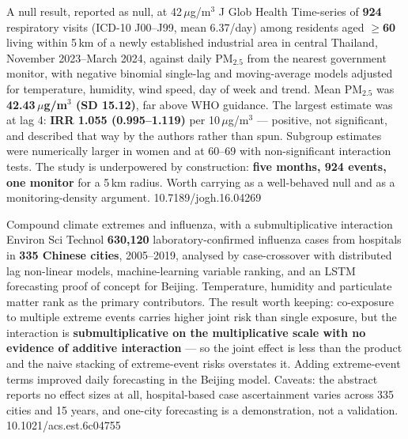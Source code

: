 \documentclass[10pt]{article}
\begin{document}
{A null result, reported as null, at 42\,$\mu$g/m$^3$}
{J Glob Health}
{Time-series of \textbf{924} respiratory visits (ICD-10 J00--J99, mean 6.37/day) among
residents aged \textbf{$\geq$60} living within 5\,km of a newly established industrial area
in central Thailand, November 2023--March 2024, against daily PM$_{2.5}$ from the nearest
government monitor, with negative binomial single-lag and moving-average models adjusted
for temperature, humidity, wind speed, day of week and trend. Mean PM$_{2.5}$ was
\textbf{42.43\,$\mu$g/m$^3$ (SD 15.12)}, far above WHO guidance. The largest estimate was at
lag 4: \textbf{IRR 1.055 (0.995--1.119)} per 10\,$\mu$g/m$^3$ --- positive, not significant,
and described that way by the authors rather than spun. Subgroup estimates were numerically
larger in women and at 60--69 with non-significant interaction tests. The study is
underpowered by construction: \textbf{five months, 924 events, one monitor} for a 5\,km
radius. Worth carrying as a well-behaved null and as a monitoring-density argument.}
{10.7189/jogh.16.04269}


{Compound climate extremes and influenza, with a submultiplicative interaction}
{Environ Sci Technol}
{\textbf{630{,}120} laboratory-confirmed influenza cases from hospitals in \textbf{335
Chinese cities}, 2005--2019, analysed by case-crossover with distributed lag non-linear
models, machine-learning variable ranking, and an LSTM forecasting proof of concept for
Beijing. Temperature, humidity and particulate matter rank as the primary contributors.
The result worth keeping: co-exposure to multiple extreme events carries higher joint risk
than single exposure, but the interaction is \textbf{submultiplicative on the
multiplicative scale with no evidence of additive interaction} --- so the joint effect is
less than the product and the naive stacking of extreme-event risks overstates it. Adding
extreme-event terms improved daily forecasting in the Beijing model. Caveats: the abstract
reports no effect sizes at all, hospital-based case ascertainment varies across 335 cities
and 15 years, and one-city forecasting is a demonstration, not a validation.}
{10.1021/acs.est.6c04755}
\end{document}
